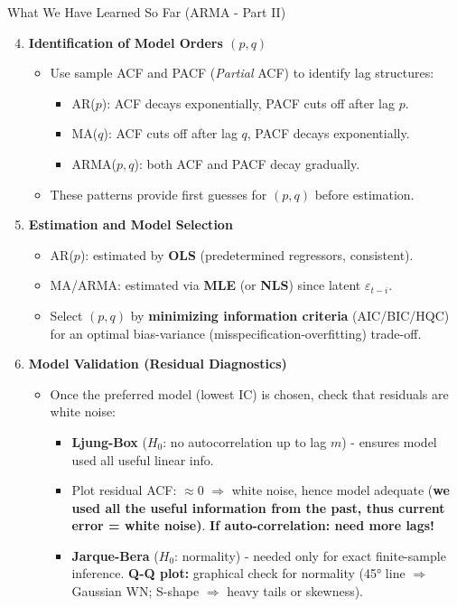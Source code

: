 \documentclass{beamer}
\begin{document}
\begin{frame}{What We Have Learned So Far (ARMA - Part II)}
\scriptsize
\begin{enumerate}
\setcounter{enumi}{3}
\item \textbf{Identification of Model Orders $(p,q)$}
  \begin{itemize}
  \scriptsize
    \item Use sample ACF and PACF (\textit{Partial} ACF) to identify lag structures:
      \begin{itemize}
        \scriptsize
        \item AR($p$): ACF decays exponentially, PACF cuts off after lag $p$.
        \item MA($q$): ACF cuts off after lag $q$, PACF decays exponentially.
        \item ARMA($p,q$): both ACF and PACF decay gradually.
      \end{itemize}
    \item These patterns provide first guesses for $(p,q)$ before estimation.
  \end{itemize}
    \pause
\item \textbf{Estimation and Model Selection}
  \begin{itemize}
  \scriptsize
    \item AR($p$): estimated by \textbf{OLS} (predetermined regressors, consistent). 
    \item MA/ARMA: estimated via \textbf{MLE} (or \textbf{NLS}) since latent $\varepsilon_{t-i}$.
    \item Select $(p,q)$ by \textbf{minimizing information criteria} (AIC/BIC/HQC) for an optimal bias-variance (misspecification-overfitting) trade-off.
  \end{itemize}
    \pause
\item \textbf{Model Validation (Residual Diagnostics)}
  \begin{itemize}
  \scriptsize
    \item Once the preferred model (lowest IC) is chosen, check that residuals are white noise:
      \begin{itemize}
        \scriptsize
        \item \textbf{Ljung-Box} ($H_0$: no autocorrelation up to lag $m$) - ensures model used all useful linear info.
        \item         Plot residual ACF: $\approx 0$ $\Rightarrow$ white noise, hence model adequate (\textbf{we used all the useful information from the past, thus current error = white noise)}.\textbf{ If auto-correlation: need more lags!}
        \item \textbf{Jarque-Bera} ($H_0$: normality) - needed only for exact finite-sample inference. \textbf{Q-Q plot:} graphical check for normality (45° line $\Rightarrow$ Gaussian WN; S-shape $\Rightarrow$ heavy tails or skewness).

      \end{itemize}
  \end{itemize}
\end{enumerate}
\end{frame}
\end{document}
